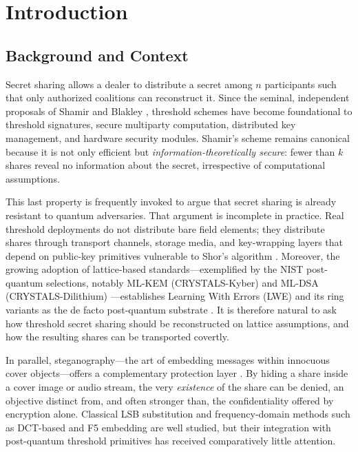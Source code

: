 \documentclass[runningheads]{llncs}
\begin{document}
\section{Introduction}
\label{sec:intro}

\subsection{Background and Context}

Secret sharing allows a dealer to distribute a secret among $n$ participants
such that only authorized coalitions can reconstruct it. Since the seminal,
independent proposals of Shamir \cite{shamir1979} and Blakley
\cite{blakley1979}, threshold schemes have become foundational to threshold
signatures, secure multiparty computation, distributed key management, and
hardware security modules. Shamir's scheme remains canonical because it is not
only efficient but \emph{information-theoretically secure}: fewer than $k$
shares reveal no information about the secret, irrespective of computational
assumptions.

This last property is frequently invoked to argue that secret sharing is
already resistant to quantum adversaries. That argument is incomplete in
practice. Real threshold deployments do not distribute bare field elements;
they distribute shares through transport channels, storage media, and
key-wrapping layers that depend on public-key primitives vulnerable to Shor's
algorithm \cite{shor1994}. Moreover, the growing adoption of lattice-based
standards---exemplified by the NIST post-quantum selections, notably ML-KEM
(CRYSTALS-Kyber) and ML-DSA (CRYSTALS-Dilithium) \cite{nist2024,avanzi2020,ducas2018}---establishes
Learning With Errors (LWE) and its ring variants as the de facto post-quantum
substrate \cite{regev2005,peikert2009,micciancio2009}. It is therefore natural
to ask how threshold secret sharing should be reconstructed on lattice
assumptions, and how the resulting shares can be transported covertly.

In parallel, steganography---the art of embedding messages within innocuous
cover objects---offers a complementary protection layer
\cite{simmons1984,cachin1998,provos2003,fridrich2009}. By hiding a share
inside a cover image or audio stream, the very \emph{existence} of the share
can be denied, an objective distinct from, and often stronger than, the
confidentiality offered by encryption alone. Classical LSB substitution
\cite{bender1996,chan2004} and frequency-domain methods such as DCT-based and
F5 embedding \cite{westfeld2001} are well studied, but their integration with
post-quantum threshold primitives has received comparatively little attention.
\end{document}
